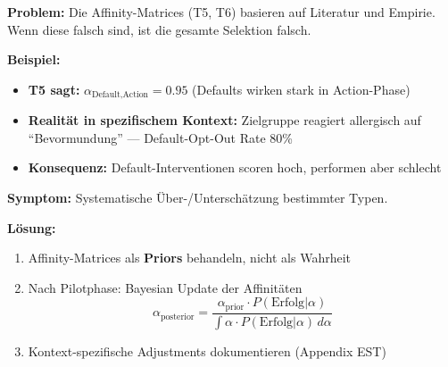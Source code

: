 \begin{tcolorbox}[colback=red!5!white, colframe=red!75!black,
    title=\textbf{Failure Mode 2: Affinity-Matrix-Fehler}]

\textbf{Problem:} Die Affinity-Matrices (T5, T6) basieren auf Literatur und Empirie. Wenn diese falsch sind, ist die gesamte Selektion falsch.

\medskip
\textbf{Beispiel:}
\begin{itemize}[nosep]
    \item \textbf{T5 sagt:} $\alpha_{\text{Default}, \text{Action}} = 0.95$ (Defaults wirken stark in Action-Phase)
    \item \textbf{Realität in spezifischem Kontext:} Zielgruppe reagiert allergisch auf ``Bevormundung'' --- Default-Opt-Out Rate 80\%
    \item \textbf{Konsequenz:} Default-Interventionen scoren hoch, performen aber schlecht
\end{itemize}

\medskip
\textbf{Symptom:} Systematische Über-/Unterschätzung bestimmter Typen.

\textbf{Lösung:}
\begin{enumerate}[nosep]
    \item Affinity-Matrices als \textbf{Priors} behandeln, nicht als Wahrheit
    \item Nach Pilotphase: Bayesian Update der Affinitäten
    \begin{equation*}
    \alpha_{\text{posterior}} = \frac{\alpha_{\text{prior}} \cdot P(\text{Erfolg}|\alpha)}{\int \alpha \cdot P(\text{Erfolg}|\alpha) \, d\alpha}
    \end{equation*}
    \item Kontext-spezifische Adjustments dokumentieren (Appendix EST)
\end{enumerate}

\end{tcolorbox}

